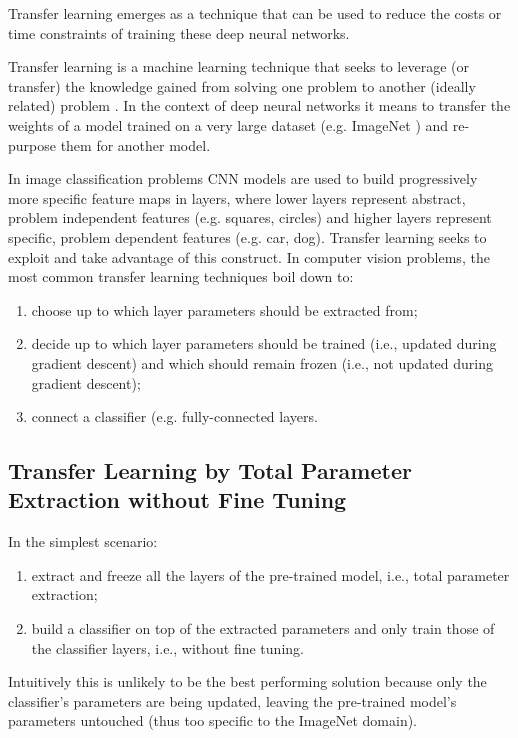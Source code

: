 Transfer learning emerges as a technique that can be used to reduce the costs or time constraints of training these deep neural networks.

Transfer learning is a machine learning technique that seeks to leverage (or transfer) the knowledge gained from solving one problem to another (ideally related) problem \cite{deeptransferlearning}. In the context of deep neural networks it means to transfer the weights of a model trained on a very large dataset (e.g. ImageNet \cite{imagenet}) and re-purpose them for another model.

In image classification problems \ac{CNN} models are used to build progressively more specific feature maps in layers, where lower layers represent abstract, problem independent features (e.g. squares, circles) and higher layers represent specific, problem dependent features (e.g. car, dog). Transfer learning seeks to exploit and take advantage of this construct. In computer vision problems, the most common transfer learning techniques boil down to:

\begin{enumerate}
    \item choose up to which layer parameters should be extracted from;
    \item decide up to which layer parameters should be trained (i.e., updated during gradient descent) and which should remain frozen (i.e., not updated during gradient descent);
    \item connect a classifier (e.g. fully-connected layers.
\end{enumerate}

\subsection{Transfer Learning by Total Parameter Extraction without Fine Tuning}

In the simplest scenario:

\begin{enumerate}
    \item extract and freeze all the layers of the pre-trained model, i.e., total parameter extraction;
    \item build a classifier on top of the extracted parameters and only train those of the classifier layers, i.e., without fine tuning.
\end{enumerate}

Intuitively this is unlikely to be the best performing solution because only the classifier's parameters are being updated, leaving the pre-trained model's parameters untouched (thus too specific to the ImageNet domain).

